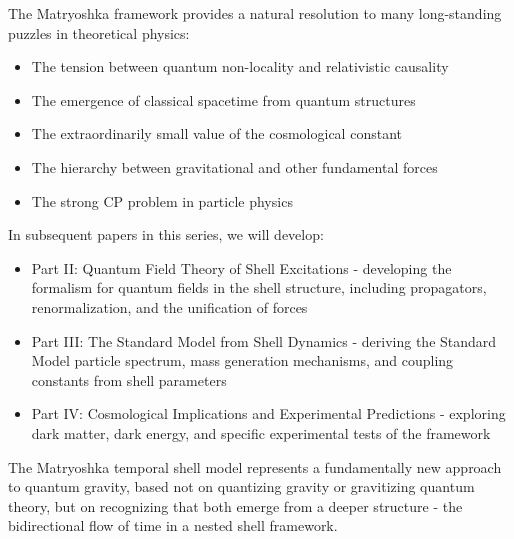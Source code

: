 \documentclass[12pt,a4paper]{article}
\begin{document}
The Matryoshka framework provides a natural resolution to many long-standing puzzles in theoretical physics:

\begin{itemize}
    \item The tension between quantum non-locality and relativistic causality
    \item The emergence of classical spacetime from quantum structures
    \item The extraordinarily small value of the cosmological constant
    \item The hierarchy between gravitational and other fundamental forces
    \item The strong CP problem in particle physics
\end{itemize}

In subsequent papers in this series, we will develop:

\begin{itemize}
    \item Part II: Quantum Field Theory of Shell Excitations - developing the formalism for quantum fields in the shell structure, including propagators, renormalization, and the unification of forces
    \item Part III: The Standard Model from Shell Dynamics - deriving the Standard Model particle spectrum, mass generation mechanisms, and coupling constants from shell parameters
    \item Part IV: Cosmological Implications and Experimental Predictions - exploring dark matter, dark energy, and specific experimental tests of the framework
\end{itemize}

The Matryoshka temporal shell model represents a fundamentally new approach to quantum gravity, based not on quantizing gravity or gravitizing quantum theory, but on recognizing that both emerge from a deeper structure - the bidirectional flow of time in a nested shell framework.



\end{document}
